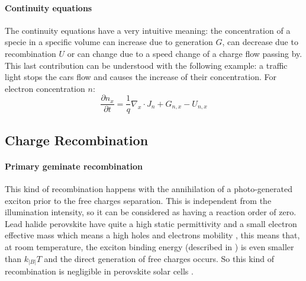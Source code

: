 		\paragraph{Continuity equations} The continuity equations have a very intuitive meaning: the concentration of a specie in a specific volume can increase due to generation $G$, can decrease due to recombination $U$ or can change due to a speed change of a charge flow passing by.
		This last contribution can be understood with the following example: a traffic light stops the cars flow and causes the increase of their concentration.
		For electron concentration $n$:
		\begin{equation}
			\frac{\partial n_x}{\partial t} = \frac{1}{q}\nabla_x \cdot J_n + G_{n,x} - U_{n,x}
		\end{equation}

	\subsection{Charge Recombination}

		\paragraph{Primary geminate recombination} \label{intro_geminate}
		This kind of recombination happens with the annihilation of a photo-generated exciton prior to the free charges separation.
		This is independent from the illumination intensity, so it can be considered as having a reaction order of zero.
		Lead halide perovskite have quite a high static permittivity \cite{Moia2019} and a small electron effective mass \cite{Herz2017} which means a high holes and electrons mobility \cite{Leijtens2014}, this means that, at room temperature, the exciton binding energy (described in ) is even smaller than $k_|B|T$ \cite{Miyata2015,Galkowski2016,Tvingstedt2015} and the direct generation of free charges occurs.
		So this kind of recombination is negligible in perovskite solar cells \cite{Wehrenfennig2014}.

